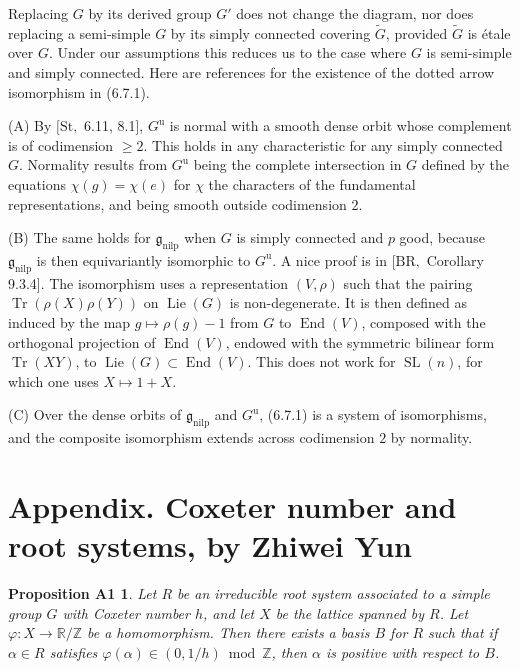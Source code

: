 \documentclass[11pt]{article}
\newcommand{\Lie}{\operatorname{Lie}}
\newcommand{\nilp}{\mathrm{nilp}}
\newcommand{\unip}{\mathrm u}
\newcommand{\SL}{\operatorname{SL}}
\newcommand{\End}{\operatorname{End}}
\newcommand{\Tr}{\operatorname{Tr}}
\newtheorem*{propositionA1}{Proposition A1}
\begin{document}
Replacing \(G\) by its derived group \(G'\) does not change the diagram, nor does replacing a
semi-simple \(G\) by its simply connected covering \(\widetilde G\), provided
\(\widetilde G\) is étale over \(G\). Under our assumptions this reduces us to the case where
\(G\) is semi-simple and simply connected. Here are references for the existence of the dotted
arrow isomorphism in (6.7.1).

(A) By \([\mathrm{St},\) 6.11, 8.1], \(G^{\unip}\) is normal with a smooth dense orbit whose
complement is of codimension \(\ge 2\). This holds in any characteristic for any simply
connected \(G\). Normality results from \(G^{\unip}\) being the complete intersection in \(G\)
defined by the equations \(\chi(g)=\chi(e)\) for \(\chi\) the characters of the fundamental
representations, and being smooth outside codimension \(2\).

(B) The same holds for \(\mathfrak g_{\nilp}\) when \(G\) is simply connected and \(p\) good,
because \(\mathfrak g_{\nilp}\) is then equivariantly isomorphic to \(G^{\unip}\). A nice proof
is in \([\mathrm{BR},\) Corollary 9.3.4]. The isomorphism uses a representation \((V,\rho)\)
such that the pairing \(\Tr(\rho(X)\rho(Y))\) on \(\Lie(G)\) is non-degenerate. It is then
defined as induced by the map \(g\mapsto \rho(g)-1\) from \(G\) to \(\End(V)\), composed with
the orthogonal projection of \(\End(V)\), endowed with the symmetric bilinear form \(\Tr(XY)\),
to \(\Lie(G)\subset\End(V)\). This does not work for \(\SL(n)\), for which one uses
\(X\mapsto 1+X\).

(C) Over the dense orbits of \(\mathfrak g_{\nilp}\) and \(G^{\unip}\), (6.7.1) is a system of
isomorphisms, and the composite isomorphism extends across codimension \(2\) by normality.

\section*{Appendix. Coxeter number and root systems, by Zhiwei Yun}

\begin{propositionA1}
Let \(R\) be an irreducible root system associated to a simple group \(G\) with Coxeter number
\(h\), and let \(X\) be the lattice spanned by \(R\). Let
\(\varphi:X\to\mathbb R/\mathbb Z\) be a homomorphism. Then there exists a basis \(B\) for
\(R\) such that if \(\alpha\in R\) satisfies
\(\varphi(\alpha)\in(0,1/h)\bmod\mathbb Z\), then \(\alpha\) is positive with respect to
\(B\).
\end{propositionA1}
\end{document}
